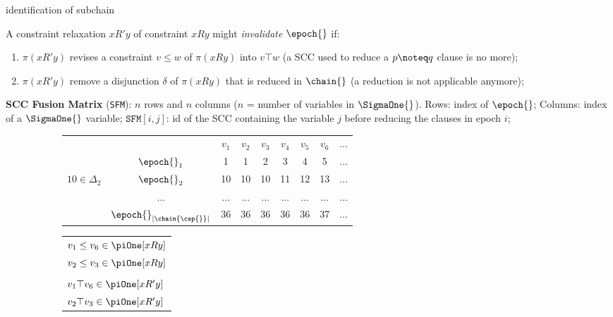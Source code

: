 \begin{frame}[noframenumbering]{\DOHSAT{} identification of subchain}

	A constraint relaxation $xR'y$ of constraint $xRy$ might \textit{invalidate} $\epoch{}$ if:
	
	\begin{enumerate}
		\item $\pi(xR'y)$ revises a constraint $v\leq w$ of $\pi(xRy)$ into $v \top w$ (a SCC used to reduce a $p \noteq q$ clause is no more);
		\item $\pi(xR'y)$ remove a disjunction $\delta$ of $\pi(xRy)$ that is reduced in $\chain{}$ (a reduction is not applicable anymore);
	\end{enumerate}

	\textbf{SCC Fusion Matrix} (\texttt{SFM}): $n$ rows and $n$ columns ($n$ = number of variables in $\SigmaOne{}$). Rows: index of $\epoch{}$; Columns: index of a $\SigmaOne{}$ variable; $\texttt{SFM}[i,j]$: id of the SCC containing the variable $j$ before reducing the clauses in epoch $i$;
	
	\begin{figure}[t]
		\centering
		\begin{subfigure}[t]{0.36\linewidth}
			\scriptsize
			\setlength\tabcolsep{1.5pt} %
			\centering
			\begin{tabular}{l|c|c|c|c|c|c|c|c|} \cline{2-9}
				\multirow{1}{*}{}					 		&	{}									& $v_1$	& $v_2$	& $v_3$	& $v_4$	& $v_5$ & $v_6$	& $...$	\\ \cline{2-9}
				\multirow{1}{*}{} 							&	$\epoch{}_1$						& 1		& 1 	& 2 	& 3		& 4		& 5		& $...$ \\ \cline{2-9}
				\multirow{1}{*}{$10 \in \Delta_2$}	&	$\epoch{}_2$						& 10 	& 10 	& 10 	& 11	& 12	& 13	& $...$ \\ \cline{2-9}
				\multirow{1}{*}{} 							&	$...$								& $...$	& $...$	& $...$	& $...$	& $...$	& $...$	& $...$	\\ \cline{2-9}
				\multirow{1}{*}{ } 							&	$\epoch{}_{|\chain{\csp{}}|}$	& 36 	& 36 	& 36 	& 36 	& 36	& 37	& $...$ \\ \cline{2-9}
			\end{tabular}
		\end{subfigure}\quad%
		\begin{subfigure}[t]{0.36\linewidth}
			\scriptsize
			\setlength\tabcolsep{1.6pt} %
			\centering
			\begin{tabular}{l}
				$v_1 \leq v_6 \in \piOne[xRy]$ \\
				$v_2 \leq v_3 \in \piOne[xRy]$ \\
				\vspace{0.001cm}\\
				$v_1 \top v_6 \in \piOne[xR'y]$ \\
				$v_2 \top v_3 \in \piOne[xR'y]$ \\
			\end{tabular}
		\end{subfigure}
	\end{figure}

\end{frame}
